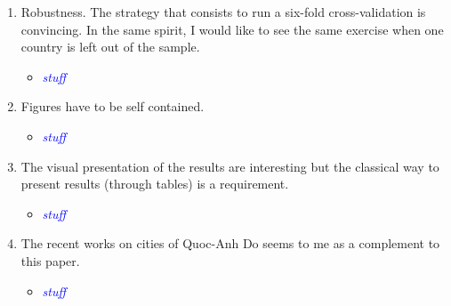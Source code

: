 \begin{enumerate}
\item Robustness. The strategy that consists to run a six-fold cross-validation is convincing. In the same spirit, I would like to see the same exercise when one country is left out of the sample.

\begin{itemize}
\item \textcolor{blue}{\emph{stuff}}
\end{itemize}

\item Figures have to be self contained.

\begin{itemize}
\item \textcolor{blue}{\emph{stuff}}
\end{itemize}

\item The visual presentation of the results are interesting but the classical way to present results (through tables) is a requirement.

\begin{itemize}
\item \textcolor{blue}{\emph{stuff}}
\end{itemize}

\item The recent works on cities of Quoc-Anh Do seems to me as a complement to this paper.

\begin{itemize}
\item \textcolor{blue}{\emph{stuff}}
\end{itemize}

\end{enumerate}